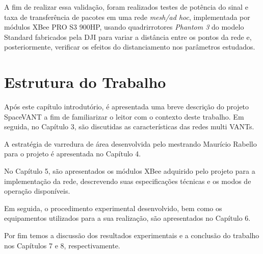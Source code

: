 A fim de realizar essa validação, foram realizados testes de potência do sinal e taxa de transferência de pacotes em uma rede \emph{mesh/ad hoc}, implementada por módulos XBee PRO S3 900HP, usando quadrirrotores \emph{Phantom 3} do modelo Standard fabricados pela DJI\textsuperscript{\texttrademark} para variar a distância entre os pontos da rede e, posteriormente, verificar os efeitos do distanciamento nos parâmetros estudados.

\section{Estrutura do Trabalho}

Após este capítulo introdutório, é apresentada uma breve descrição do projeto SpaceVANT a fim de familiarizar o leitor com o contexto deste trabalho. Em seguida, no Capítulo 3, são discutidas as características das redes multi VANTs. 

A estratégia de varredura de área desenvolvida pelo mestrando Maurício Rabello para o projeto é apresentada no Capítulo 4. 

No Capítulo 5, são apresentados os módulos XBee adquirido pelo projeto para a implementação da rede, descrevendo suas especificações técnicas e os modos de operação disponíveis. 

Em seguida, o procedimento experimental desenvolvido, bem como os equipamentos utilizados para a sua realização, são apresentados no Capítulo 6.

Por fim temos a discussão dos resultados experimentais e a conclusão do trabalho nos Capítulos 7 e 8, respectivamente.  